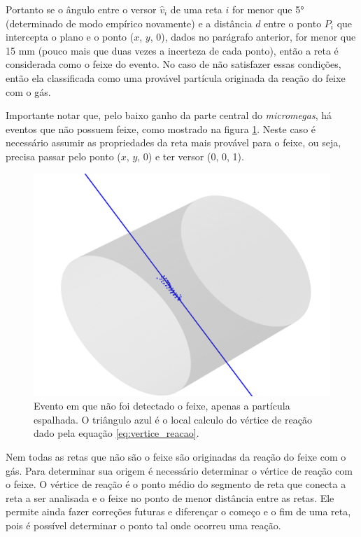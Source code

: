 \documentclass[a4paper,12pt,oneside]{book}
\begin{document}
\par Portanto se o ângulo entre o versor $\hat{v}_i$ de uma reta $i$ for menor que 5° (determinado de modo empírico novamente) e a distância $d$ entre o ponto $P_i$ que intercepta o plano e o ponto ($x$, $y$, 0), dados no parágrafo anterior, for menor que 15 mm (pouco mais que duas vezes a incerteza de cada ponto), então a reta é considerada como o feixe do evento. No caso de não satisfazer essas condições, então ela classificada como uma provável partícula originada da reação do feixe com o gás.

\par Importante notar que, pelo baixo ganho da parte central do \textit{micromegas}, há eventos que não possuem feixe, como mostrado na figura \ref{fig:exemplo_sem_feixe}. Neste caso é necessário assumir as propriedades da reta mais provável para o feixe, ou seja, precisa passar pelo ponto ($x$, $y$, 0) e ter versor (0, 0, 1).

\begin{figure}[H]
    \centering
    \includegraphics[scale = 0.85]{figs/Figure_12.png}
    \caption{Evento em que não foi detectado o feixe, apenas a partícula espalhada. O triângulo azul é o local calculo do vértice de reação dado pela equação \ref{eq:vertice_reacao}.}
    \label{fig:exemplo_sem_feixe}
\end{figure}

\par Nem todas as retas que não são o feixe são originadas da reação do feixe com o gás. Para determinar sua origem é necessário determinar o vértice de reação com o feixe. O vértice de reação é o ponto médio do segmento de reta que conecta a reta a ser analisada e o feixe no ponto de menor distância entre as retas. Ele permite ainda fazer correções futuras e diferençar o começo e o fim de uma reta, pois é possível determinar o ponto tal onde ocorreu uma reação.
\end{document}
